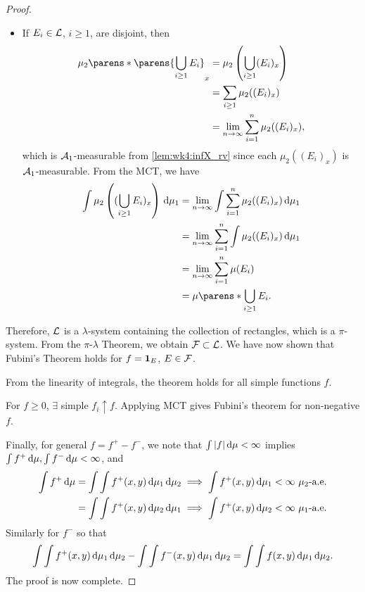 \documentclass[12pt]{article}
\begin{document}
\begin{proof}
\begin{itemize}
\item If $E_i \in \mathcal{L}$, $i\geq 1$, are disjoint, then
\begin{align*}
\mu_2\parens*{\parens{\bigcup_{i \geq 1}E_i}_x}
&=\mu_2\left(\bigcup_{i \geq 1}({E_i})_x\right) \\
& = \sum_{i \geq 1} \mu_2((E_i)_x)\\
& =\lim_{n \to \infty} \sum_{i=1}^n \mu_2((E_i)_x),
\end{align*}
which is $\mathcal{A}_1$-measurable from \cref{lem:wk4:infX_rv} since each $\mu_2((E_i)_x)$ is $\mathcal{A}_1$-measurable. From the MCT, we have
\begin{align*}
\int \mu_2\left((\bigcup_{i \geq 1}{E_i})_x\right) \ud \mu_1 
& = \lim_{n \to \infty}{\int \sum_{i = 1}^n{\mu_2 ((E_i)_x} )\ud \mu_1 }\\
& =  \lim_{n \to \infty}{\sum_{i = 1}^n{\int \mu_2 ((E_i)_x} )\ud \mu_1 }\\
& = \lim_{n \to \infty}\sum_{i=1}^n \mu (E_i)\\
& = \mu\parens*{\bigcup_{i \geq 1} {E_i}}.
\end{align*}
\end{itemize}
Therefore, $\mathcal{L}$ is a $\lambda$-system containing the collection of rectangles, which is a $\pi$-system. From the $\pi$-$\lambda$ Theorem, we obtain $\mathcal{F} \subset \mathcal{L}$. We have now shown that Fubini's Theorem holds for $f={\bf 1}_{E}$, $E \in \mathcal{F}$.

From the linearity of integrals, the theorem holds for all simple functions $f$.

For $f \geq 0$, $\exists$ simple $f_i \uparrow f$. Applying MCT gives Fubini's theorem for non-negative $f$.

Finally, for general $f=f^+-f^-$, we note that $\int |f| \,\mathrm{d} \mu <\infty$ implies $\int f^+ \,\mathrm{d} \mu, \int f^- \,\mathrm{d} \mu<\infty$, and
\begin{align*}
\int f^+ \,\mathrm{d} \mu = \int \int f^+(x,y) \,\mathrm{d} \mu_1 \,\mathrm{d} \mu_2 \implies  \int f^+(x,y) \,\mathrm{d} \mu_1 <\infty\ \text{$\mu_2$-a.e.} \\
= \int \int f^+(x,y) \,\mathrm{d} \mu_2 \,\mathrm{d} \mu_1 \implies  \int f^+(x,y) \,\mathrm{d} \mu_2 <\infty\ \text{$\mu_1$-a.e.} 
\end{align*}
Similarly for $f^-$ so that
\begin{align*}
 \int \int f^+(x,y) \,\mathrm{d} \mu_1 \,\mathrm{d} \mu_2 - \int \int f^-(x,y) \,\mathrm{d} \mu_1 \,\mathrm{d} \mu_2 = \int \int f(x,y) \,\mathrm{d} \mu_1 \,\mathrm{d} \mu_2.
\end{align*}
The proof is now complete.
\end{proof}
\end{document}

